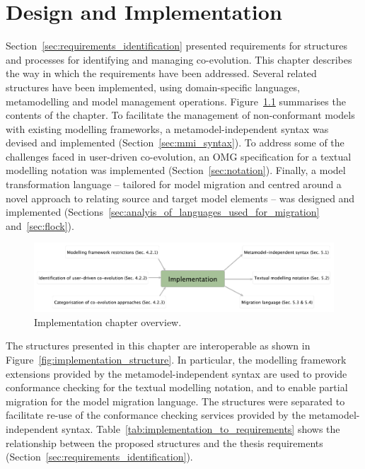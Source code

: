 
\chapter{Design and Implementation}
\label{Implementation}
Section~\ref{sec:requirements_identification} presented requirements for structures and processes for identifying and managing co-evolution. This chapter describes the way in which the requirements have been addressed. Several related structures have been implemented, using domain-specific languages, metamodelling and model management operations. Figure~\ref{fig:implementation_overview} summarises the contents of the chapter. To facilitate the management of non-conformant models with existing modelling frameworks, a metamodel-independent syntax was devised and implemented (Section~\ref{sec:mmi_syntax}). To address some of the challenges faced in user-driven co-evolution, an OMG specification for a textual modelling notation was implemented (Section~\ref{sec:notation}). Finally, a model transformation language -- tailored for model migration and centred around a novel approach to relating source and target model elements -- was designed and implemented (Sections~\ref{sec:analyis_of_languages_used_for_migration} and~\ref{sec:flock}). 

\begin{figure}[htbp]
  \begin{center}
    \leavevmode
    \includegraphics[width=12cm]{5.Implementation/overview.pdf}
  \end{center}
  \caption{Implementation chapter overview.}
  \label{fig:implementation_overview}
\end{figure}

The structures presented in this chapter are interoperable as shown in Figure~\ref{fig:implementation_structure}. In particular, the modelling framework extensions provided by the metamodel-independent syntax are used to provide conformance checking for the textual modelling notation, and to enable partial migration for the model migration language. The structures were separated to facilitate re-use of the conformance checking services provided by the metamodel-independent syntax. Table~\ref{tab:implementation_to_requirements} shows the relationship between the proposed structures and the thesis requirements (Section~\ref{sec:requirements_identification}).

